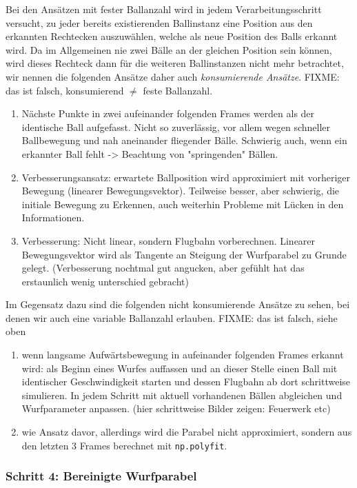 \documentclass[12pt,a4paper,ngerman]{scrartcl}
\begin{document}
Bei den Ansätzen mit fester Ballanzahl wird in jedem Verarbeitungsschritt versucht,
zu jeder bereits existierenden Ballinstanz eine Position aus den erkannten Rechtecken
auszuwählen, welche als neue Position des Balls erkannt wird. Da im Allgemeinen nie
zwei Bälle an der gleichen Position sein können, wird dieses Rechteck dann für die weiteren Ballinstanzen nicht mehr betrachtet, wir nennen die folgenden Ansätze daher
auch \textit{konsumierende Ansätze}. FIXME: das ist falsch, konsumierend $\neq$ feste Ballanzahl.
 
 \begin{enumerate}
 \item Nächste Punkte in zwei aufeinander folgenden Frames werden als der identische Ball aufgefasst. Nicht so zuverlässig, vor allem wegen schneller Ballbewegung und nah aneinander fliegender Bälle. Schwierig auch, wenn ein erkannter Ball fehlt -> Beachtung von "springenden" Bällen.
 \item Verbesserungsansatz: erwartete Ballposition wird approximiert mit vorheriger Bewegung (linearer Bewegungsvektor). Teilweise besser, aber schwierig, die initiale Bewegung zu Erkennen, auch weiterhin Probleme mit Lücken in den Informationen.
 \item Verbesserung: Nicht linear, sondern Flugbahn vorberechnen. Linearer Bewegungsvektor wird als Tangente an Steigung der Wurfparabel zu Grunde gelegt. (Verbesserung nochtmal gut angucken, aber gefühlt hat das erstaunlich wenig unterschied gebracht)
  \end{enumerate}
  
  
Im Gegensatz dazu sind die folgenden nicht konsumierende Ansätze zu sehen, bei denen
wir auch eine variable Ballanzahl erlauben. FIXME: das ist falsch, siehe oben
  
\begin{enumerate}
	\item wenn langsame Aufwärtsbewegung in aufeinander folgenden Frames erkannt wird: als Beginn eines Wurfes auffassen und an dieser Stelle einen Ball mit identischer Geschwindigkeit starten und dessen Flugbahn ab dort schrittweise simulieren. In jedem Schritt mit aktuell vorhandenen Bällen abgleichen und Wurfparameter anpassen. (hier schrittweise Bilder zeigen: Feuerwerk etc)
	\item wie Ansatz davor, allerdings wird die Parabel nicht approximiert, sondern
	aus den letzten 3 Frames berechnet mit \lstinline{np.polyfit}.
\end{enumerate}


\subsubsection{Schritt 4: Bereinigte Wurfparabel}
\end{document}
